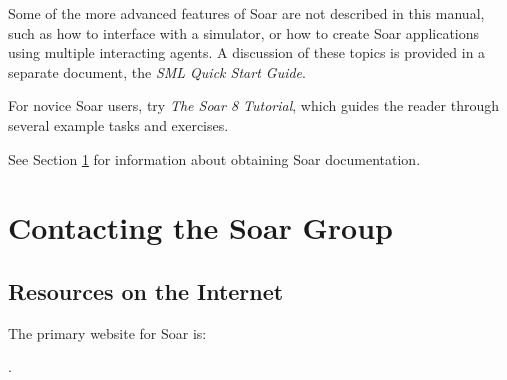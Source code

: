 Some of the more advanced features of Soar are not described in this
manual, such as how to interface with a simulator, or how to create Soar
applications using multiple interacting agents.  A discussion of
these topics is provided in a separate document, the \textit{SML Quick Start Guide}.

For novice Soar users, try \textit{The Soar 8 Tutorial}, which guides the reader 
through several example tasks and exercises.

See Section \ref{CONTACT} for information about obtaining Soar documentation.

%
%
\section{Contacting the Soar Group}
\label{CONTACT}

\subsection*{Resources on the Internet}

The primary website for Soar is:

\hspace{2em}.

